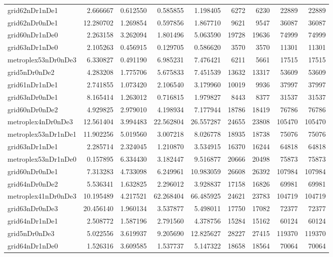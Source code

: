 \begin{longtable}{|l|r|r|r|r|r|r|r|r|}
grid62nDr1nDe1 & 2.666667 & 0.612550 & 0.585855 & 1.198405 & 6272 & 6230 & 22889 & 22889 \\
grid62nDr0nDe1 & 12.280702 & 1.269854 & 0.597856 & 1.867710 & 9621 & 9547 & 36087 & 36087 \\
grid60nDr1nDe0 & 2.263158 & 3.262094 & 1.801496 & 5.063590 & 19728 & 19636 & 74999 & 74999 \\
grid63nDr1nDe0 & 2.105263 & 0.456915 & 0.129705 & 0.586620 & 3570 & 3570 & 11301 & 11301 \\
metroplex53nDr0nDe3 & 6.330827 & 0.491190 & 6.985231 & 7.476421 & 6211 & 5661 & 17515 & 17515 \\
grid5nDr0nDe2 & 4.283208 & 1.775706 & 5.675833 & 7.451539 & 13632 & 13317 & 53609 & 53609 \\
grid61nDr1nDe1 & 2.741855 & 1.073420 & 2.106540 & 3.179960 & 10019 & 9936 & 37997 & 37997 \\
grid63nDr0nDe1 & 8.165414 & 1.263012 & 0.716815 & 1.979827 & 8443 & 8377 & 31537 & 31537 \\
grid60nDr0nDe2 & 4.929825 & 2.979010 & 4.198934 & 7.177944 & 18786 & 18419 & 76786 & 76786 \\
metroplex4nDr0nDe3 & 12.561404 & 3.994483 & 22.562804 & 26.557287 & 24655 & 23808 & 105470 & 105470 \\
metroplex53nDr1nDe1 & 11.902256 & 5.019560 & 3.007218 & 8.026778 & 18935 & 18738 & 75076 & 75076 \\
grid63nDr1nDe1 & 2.285714 & 2.324045 & 1.210870 & 3.534915 & 16370 & 16244 & 64818 & 64818 \\
metroplex53nDr1nDe0 & 0.157895 & 6.334430 & 3.182447 & 9.516877 & 20666 & 20498 & 75873 & 75873 \\
grid60nDr0nDe1 & 7.313283 & 4.733098 & 6.249961 & 10.983059 & 26608 & 26392 & 107984 & 107984 \\
grid64nDr0nDe2 & 5.536341 & 1.632825 & 2.296012 & 3.928837 & 17158 & 16826 & 69981 & 69981 \\
metroplex41nDr0nDe3 & 10.195489 & 4.217521 & 62.268404 & 66.485925 & 24621 & 23783 & 104719 & 104719 \\
grid63nDr0nDe3 & 20.456140 & 1.960134 & 3.537877 & 5.498011 & 17750 & 17082 & 72377 & 72377 \\
grid64nDr1nDe1 & 2.508772 & 1.587196 & 2.791560 & 4.378756 & 15284 & 15162 & 60124 & 60124 \\
grid5nDr0nDe3 & 5.022556 & 3.619937 & 9.205690 & 12.825627 & 28227 & 27415 & 119370 & 119370 \\
grid64nDr1nDe0 & 1.526316 & 3.609585 & 1.537737 & 5.147322 & 18658 & 18564 & 70064 & 70064 \\

\end{longtable}
